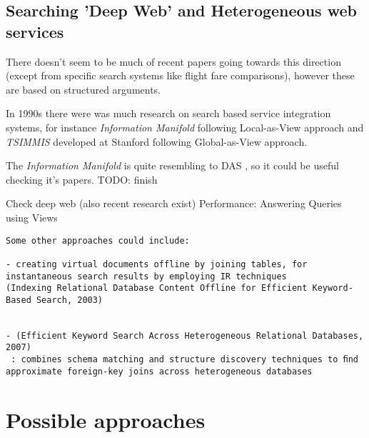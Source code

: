 \documentclass[a4paper,11pt,draft]{article}
\begin{document}








\subsection{Searching 'Deep Web' and Heterogeneous web services}
{\color{red}There doesn't seem to be much of recent papers going towards this direction (except from specific search systems like flight fare comparisons), however these are based on structured arguments.} 

In 1990s there were was much research on search based service integration systems, for instance \textit{Information Manifold} following Local-as-View approach and \textit{TSIMMIS} developed at Stanford following Global-as-View approach. 

The \textit{Information Manifold} is quite resembling to DAS {\color{red},  so it could be useful checking it's papers. TODO: finish}

{\color{red}Check deep web (also recent research exist)}
{\color{red}Performance: Answering Queries using Views}


\begin{verbatim}
Some other approaches could include: 

- creating virtual documents offline by joining tables, for instantaneous search results by employing IR techniques
(Indexing Relational Database Content Offline for Efficient Keyword-Based Search, 2003)


- (Efficient Keyword Search Across Heterogeneous Relational Databases, 2007)
 : combines schema matching and structure discovery techniques to ﬁnd approximate foreign-key joins across heterogeneous databases
\end{verbatim}


\section{Possible approaches}
\end{document}
